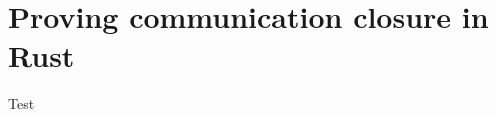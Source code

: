 \chapter{Proving communication closure in Rust}
\label{rustcommclosure}

Test \cite{abadi_existence_1988}
